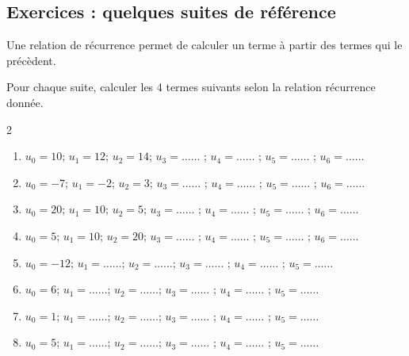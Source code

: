 \documentclass[main.tex]{subfiles}
\begin{document}
\subsection{Exercices : quelques  suites de référence}
\begin{eBox}
Une relation de récurrence permet de calculer un terme à partir des termes qui le précèdent.
\end{eBox}
	\vspace{-0.25em}
\begin{exercise}\label{chapter05:exercise:suites01} Pour chaque suite, calculer les 4 termes suivants selon la relation récurrence donnée.
	\vspace{-1em}
	\begin{spacing}{2}
\begin{enumerate}[label=\alph*),leftmargin=*]
	\item $u_0=10$; $u_1=12$; $u_2=14$; $u_3=\ldots\ldots$ ; $u_4=\ldots\ldots$  ; $u_5=\ldots\ldots$ ; $u_6=\ldots\ldots$\hfill {}
	\item $u_0=-7$; $u_1=-2$; $u_2=3$; $u_3=\ldots\ldots$ ; $u_4=\ldots\ldots$  ; $u_5=\ldots\ldots$ ; $u_6=\ldots\ldots$\hfill \hfill {} 
	\item $u_0=20$; $u_1=10$; $u_2=5$; $u_3=\ldots\ldots$ ; $u_4=\ldots\ldots$  ; $u_5=\ldots\ldots$ ; $u_6=\ldots\ldots$\hfill \hfill {}
	\item $u_0=5$; $u_1=10$; $u_2=20$; $u_3=\ldots\ldots$ ; $u_4=\ldots\ldots$  ; $u_5=\ldots\ldots$ ; $u_6=\ldots\ldots$\hfill \hfill  {}
	\item $u_0=-12$; $u_1=\ldots\ldots$; $u_2=\ldots\ldots$; $u_3=\ldots\ldots$ ; $u_4=\ldots\ldots$  ; $u_5=\ldots\ldots$   \hfill \hfill  {}
	\item $u_0=6$; $u_1=\ldots\ldots$; $u_2=\ldots\ldots$; $u_3=\ldots\ldots$ ; $u_4=\ldots\ldots$  ; $u_5=\ldots\ldots$   \hfill \hfill  {}
	\item $u_0=1$; $u_1=\ldots\ldots$; $u_2=\ldots\ldots$; $u_3=\ldots\ldots$ ; $u_4=\ldots\ldots$  ; $u_5=\ldots\ldots$   \hfill \hfill  {}
	\item $u_0=5$; $u_1=\ldots\ldots$; $u_2=\ldots\ldots$; $u_3=\ldots\ldots$ ; $u_4=\ldots\ldots$  ; $u_5=\ldots\ldots$   \hfill \hfill {}
\end{enumerate} 
\end{spacing}\vspace{-0.5em}
\end{exercise}
\end{document}
